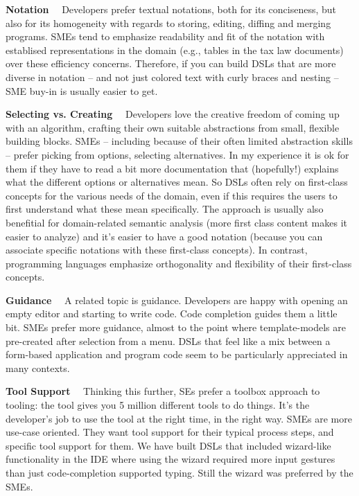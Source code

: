 \documentclass[runningheads]{llncs}
\newcommand\parhead[1]{\vspace{1mm}\noindent\textbf{{#1}}\ \ }
\begin{document}
\parhead{Notation} Developers prefer textual notations, both for its
conciseness, but also for its homogeneity with regards to storing, editing,
diffing and merging programs. SMEs tend to emphasize readability and fit of
the notation with establised representations in the domain (e.g., tables in
the tax law documents) over these efficiency concerns. Therefore, if you can
build DSLs that are more diverse in notation -- and not just colored text with
curly braces and nesting -- SME buy-in is usually easier to get.

\parhead{Selecting vs. Creating} Developers love the creative freedom of coming
up with an algorithm, crafting their own suitable abstractions from small,
flexible building blocks. SMEs -- including because of their often limited
abstraction skills -- prefer picking from options, selecting alternatives.
In my experience it is ok for them if they have to read a bit more documentation
that (hopefully!) explains what the different options or alternatives mean.
So DSLs often rely on first-class concepts for the various needs of the domain,
even if this requires the users to first understand what these mean
specifically. The approach is usually also benefitial for domain-related
semantic analysis (more first class content makes it easier to analyze) and it's
easier to have a good notation (because you can associate specific notations
with these first-class concepts). In contrast, programming languages emphasize
orthogonality and flexibility of their first-class concepts.

\parhead{Guidance} A related topic is guidance. Developers are happy with
opening an empty editor and starting to write code. Code completion guides
them a little bit. SMEs prefer more guidance, almost to the point where 
template-models are pre-created after selection from a menu. DSLs that feel
like a mix between a form-based application and program code seem to be 
particularly appreciated in many contexts.

\parhead{Tool Support} Thinking this further, SEs prefer a toolbox approach
to tooling: the tool gives you 5 million different tools to do things. It's
the developer's job to use the tool at the right time, in the right way.
SMEs are more use-case oriented. They want tool support for their typical
process steps, and specific tool support for them. We have built DSLs that
included wizard-like functionality in the IDE where using the wizard required
more input gestures than just code-completion supported typing. Still the
wizard was preferred by the SMEs.
 
\end{document}
